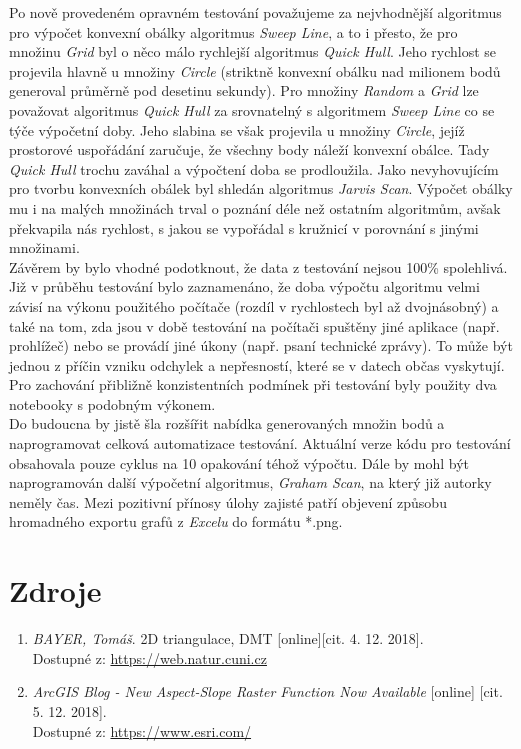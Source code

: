 \documentclass[a4paper, 12pt]{article}
\begin{document}
Po nově provedeném opravném testování považujeme za nejvhodnější algoritmus pro výpočet konvexní obálky algoritmus \textit{Sweep Line}, a to i přesto, že pro množinu \textit{Grid} byl o něco málo rychlejší algoritmus \textit{Quick Hull}. Jeho rychlost se projevila hlavně u množiny \textit{Circle} (striktně konvexní obálku nad milionem bodů generoval průměrně pod desetinu sekundy). Pro množiny \textit{Random} a \textit{Grid} lze považovat algoritmus \textit{Quick Hull} za srovnatelný s algoritmem \textit{Sweep Line} co se týče výpočetní doby. Jeho slabina se však projevila u množiny \textit{Circle}, jejíž prostorové uspořádání zaručuje, že všechny body náleží konvexní obálce. Tady \textit{Quick Hull} trochu zaváhal a výpočtení doba se prodloužila. Jako nevyhovujícím pro tvorbu konvexních obálek byl shledán algoritmus \textit{Jarvis Scan}. Výpočet obálky mu i na malých množinách trval o poznání déle než ostatním algoritmům, avšak překvapila nás rychlost, s jakou se vypořádal s kružnicí v porovnání s jinými množinami.\\

Závěrem by bylo vhodné podotknout, že data z testování nejsou 100\% spolehlivá. Již v průběhu testování bylo zaznamenáno, že doba výpočtu algoritmu velmi závisí na výkonu použitého počítače (rozdíl v rychlostech byl až dvojnásobný) a také na tom, zda jsou v době testování na počítači spuštěny jiné aplikace (např. prohlížeč) nebo se provádí jiné úkony (např. psaní technické zprávy). To může být jednou z příčin vzniku odchylek a nepřesností, které se v datech občas vyskytují. Pro zachování přibližně konzistentních podmínek při testování byly použity dva notebooky s podobným výkonem.\\

Do budoucna by jistě šla rozšířit nabídka generovaných množin bodů a naprogramovat celková automatizace testování. Aktuální verze kódu pro testování obsahovala pouze cyklus na 10 opakování téhož výpočtu. Dále by mohl být naprogramován další výpočetní algoritmus, \textit{Graham Scan}, na který již autorky neměly čas. Mezi pozitivní přínosy úlohy zajisté patří objevení způsobu hromadného exportu grafů z \textit{Excelu} do formátu *.png.

\clearpage

\section{Zdroje}
\begin{enumerate}
\item  \textsl{BAYER, Tomáš}. 2D triangulace, DMT [online][cit. 4. 12. 2018].\\
Dostupné z: \href{https://web.natur.cuni.cz/~bayertom/images/courses/Adk/adk5.pdf}{https://web.natur.cuni.cz}

\item  \textsl{ArcGIS Blog - New Aspect-Slope Raster Function Now Available} [online] [cit. 5. 12. 2018].\\
Dostupné z: \href{https://www.esri.com/arcgis-blog/products/arcgis-pro/imagery/new-aspect-slope-raster-function-now-available/?fbclid=IwAR0LX-HblA_iPSqg19aUKDW096LjaShp9r_ql8QwA_OJ26EkcFTpOEWJrlg}{https://www.esri.com/}


\end{enumerate}
\end{document}
